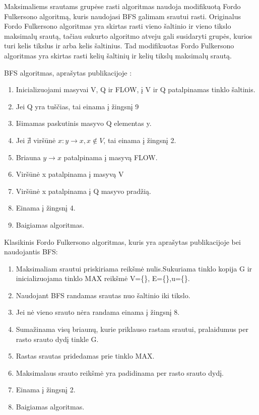Maksimaliems srautams grupėse rasti algoritmas naudoja modifikuotą Fordo Fulkersono algoritmą, kuris naudojasi BFS \cite{BFS} galimam srautui rasti. Originalus Fordo Fulkersono algoritmas \cite{FiN} yra skirtas rasti vieno šaltinio ir vieno tikslo maksimalų srautą, tačiau sukurto algoritmo atveju gali susidaryti grupės, kurios turi kelis tikslus ir arba kelis šaltinius. Tad modifikuotas Fordo Fulkersono algoritmas yra skirtas rasti kelių šaltinių ir kelių tikslų maksimalų srautą.

BFS algoritmas, aprašytas publikacijoje :
\begin{enumerate}
	\item Inicializuojami masyvai V, Q ir FLOW, į V ir Q patalpinamas tinklo šaltinis.
	\item Jei Q yra tuščias, tai einama į žingsnį 9
	\item Išimamas paskutinis masyvo Q elementas y.
	\item Jei $\nexists$ viršūnė $x : y \rightarrow x, x \notin V$, tai einama į žingsnį 2. 
	\item Briauna $y  \rightarrow x$ patalpinama į masyvą FLOW. 
	\item Viršūnė x patalpinama į masyvą V
	\item Viršūnė x patalpinama į Q masyvo pradžią. 
	\item Einama į žingsnį 4. 
	\item Baigiamas algoritmas.
\end{enumerate}

Klasikinis Fordo Fulkersono algoritmas, kuris yra aprašytas publikacijoje bei naudojantis BFS:
\begin{enumerate}
	\item Maksimaliam srautui priskiriama reikšmė nulis.Sukuriama tinklo kopija G ir inicializuojama tinklo MAX reikšmė {V=\{\}, E=\{\},u=\{\}}.
	\item Naudojant BFS randamas srautas nuo šaltinio iki tikslo.
	\item Jei nė vieno srauto nėra randama einama į žingsnį 8.
	\item Sumažinama visų briaunų, kurie priklauso rastam srautui, pralaidumus per rasto srauto dydį tinkle G.
	\item Rastas srautas pridedamas prie tinklo MAX.
	\item Maksimalaus srauto reikšmė yra padidinama per rasto srauto dydį.
	\item Einama į žingsnį 2.
	\item Baigiamas algoritmas.
\end{enumerate}

